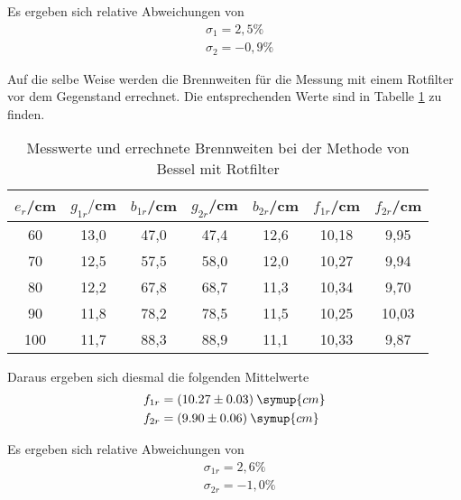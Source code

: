 Es ergeben sich relative Abweichungen von
\begin{align*}
  &\sigma_1 = 2,5 \% \\
  &\sigma_2 = -0,9 \%
\end{align*}

Auf die selbe Weise werden die Brennweiten für die Messung mit einem Rotfilter vor dem Gegenstand errechnet. Die
entsprechenden Werte sind in Tabelle \ref{tab:besselrot} zu finden.
\begin{table}[H]
  \centering
  \caption{Messwerte und errechnete Brennweiten bei der Methode von Bessel mit Rotfilter}
  \label{tab:besselrot}
  \begin{tabular}{c c c c c c c}
    \toprule
    $e_r$/cm  & $g_{1r}/$cm & $b_{1r}$/cm & $g_{2r}$/cm & $b_{2r}$/cm & $f_{1r}$/cm & $f_{2r}$/cm \\
    \midrule
    60  &   13,0 &  47,0  &  47,4  &  12,6 & 10,18 & 9,95  \\
    70   &  12,5 &  57,5  &  58,0  &  12,0 & 10,27 & 9,94 \\
    80   &  12,2 &  67,8  &  68,7  &  11,3 & 10,34 & 9,70 \\
    90   &  11,8 &  78,2  &  78,5  &  11,5 & 10,25 & 10,03 \\
    100  &  11,7 &  88,3  &  88,9  &  11,1 & 10,33 & 9,87 \\
    \bottomrule
  \end{tabular}
\end{table}

Daraus ergeben sich diesmal die folgenden Mittelwerte
\begin{align*}
  &f_{1r} = (10.27 \pm 0.03) \: \symup{cm} \\
  &f_{2r} = (9.90 \pm 0.06) \: \symup{cm}
\end{align*}

Es ergeben sich relative Abweichungen von
\begin{align*}
  &\sigma_{1r} = 2,6 \% \\
  &\sigma_{2r} = -1,0 \%
\end{align*}

